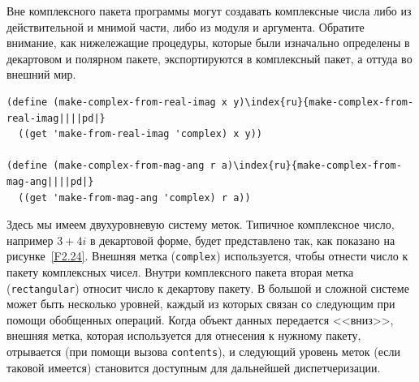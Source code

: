 Вне комплексного пакета программы могут создавать
комплексные числа либо из действительной и мнимой части, либо из
модуля и аргумента.  Обратите внимание, как нижележащие процедуры,
которые были изначально определены в декартовом и полярном пакете,
экспортируются в комплексный пакет, а оттуда во внешний мир.


\begin{Verbatim}[fontsize=\small]
(define (make-complex-from-real-imag x y)\index{ru}{make-complex-from-real-imag||||pd|}
  ((get 'make-from-real-imag 'complex) x y))

(define (make-complex-from-mag-ang r a)\index{ru}{make-complex-from-mag-ang||||pd|}
  ((get 'make-from-mag-ang 'complex) r a))
\end{Verbatim}

Здесь мы имеем двухуровневую систему меток.  Типичное
комплексное число, например $3+4i$ в декартовой
форме, будет представлено так, как показано на рисунке~\ref{F2.24}.
Внешняя метка ({\tt complex}) используется, чтобы отнести число
к пакету комплексных чисел.  Внутри комплексного пакета вторая метка
({\tt rectangular}) относит число к декартову пакету.  В
большой и сложной системе может быть несколько уровней, каждый из
которых связан со следующим при помощи обобщенных операций.  Когда
объект данных передается <<вниз>>, внешняя метка, которая используется
для отнесения к нужному пакету, отрывается (при помощи вызова
{\tt contents}), и следующий уровень меток (если таковой имеется)
становится доступным для дальнейшей диспетчеризации.

